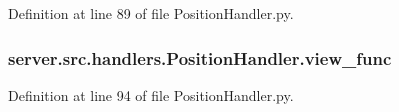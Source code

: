 Definition at line 89 of file Position\+Handler.\+py.

\subsubsection[{\texorpdfstring{view\+\_\+func}{view_func}}]{\setlength{\rightskip}{0pt plus 5cm}server.\+src.\+handlers.\+Position\+Handler.\+view\+\_\+func}\hypertarget{namespaceserver_1_1src_1_1handlers_1_1_position_handler_a607534a21aea57e3bcf30c922e2e575c}{}\label{namespaceserver_1_1src_1_1handlers_1_1_position_handler_a607534a21aea57e3bcf30c922e2e575c}


Definition at line 94 of file Position\+Handler.\+py.

